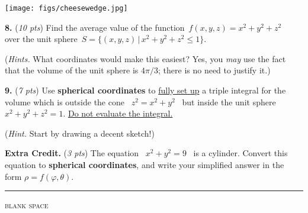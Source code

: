 \documentclass[11pt]{amsart}
\newcommand{\prob}[1]{\bigskip\noindent\textbf{#1.} }
\newcommand{\pts}[1]{(\emph{#1 pts})}
\newcommand{\probpts}[2]{\prob{#1} \pts{#2} \quad}
\begin{document}
\bigskip \hfill \texttt{[image: figs/cheesewedge.jpg]}
\vfill


\clearpage\newpage
\probpts{8}{10}  Find the average value of the function \,{\large $f(x,y,z)=x^2+y^2+z^2$} \, over the unit sphere  \,{\large $S = \Big\{(x,y,z)\,\big|\, x^2 + y^2 + z^2 \le 1\Big\}$}.

\medskip \noindent
(\emph{Hints.}  What coordinates would make this easiest?  Yes, you \emph{may} use the fact that the volume of the unit sphere is $4\pi/3$; there is no need to justify it.)
\vspace{4.5in}

\probpts{9}{7}  Use \textbf{spherical coordinates} to \underline{fully set up} a triple integral for the volume which is outside the cone \, {\large $z^2=x^2+y^2$} \, but inside the unit sphere \, {\large $x^2+y^2 + z^2 =1$}.  \underline{Do not evaluate the integral.}

\medskip \noindent
(\emph{Hint.}  Start by drawing a decent sketch!)
\vfill

\clearpage\newpage
\probpts{Extra Credit}{3}  The equation \, {\large $x^2+y^2=9$} \, is a cylinder.  Convert this equation to \textbf{spherical coordinates}, and write your simplified answer in the form {\large $\rho=f(\varphi,\theta)$}.
\vfill

\bigskip
\noindent \hrule
\begin{center}
\small
\bigskip
\textsc{blank space}
\end{center}
\vfill
\end{document}
